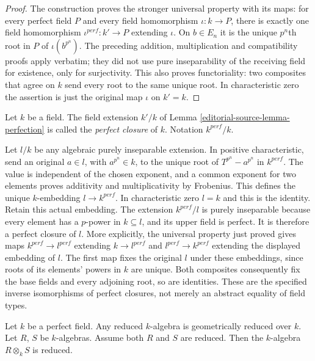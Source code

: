 \begin{proof}
The construction proves the stronger universal
property with its maps: for every perfect
field $P$ and every field homomorphism
$\iota:k\to P$, there is exactly one field
homomorphism $\iota^{perf}:k'\to P$ extending
$\iota$. On $b\in E_n$ it is the unique
$p^n$th root in $P$ of $\iota(b^{p^n})$.
The preceding addition, multiplication and
compatibility proofs apply verbatim; they
did not use pure inseparability of the
receiving field for existence, only for
surjectivity. This also proves functoriality:
two composites that agree on $k$ send every
root to the same unique root. In
characteristic zero the assertion is just
the original map $\iota$ on $k'=k$.
\end{proof}

\begin{definition}
\label{editorial-source-definition-perfection}
Let $k$ be a field. The field extension $k'/k$ of Lemma \ref{editorial-source-lemma-perfection}
is called the {\it perfect closure} of $k$. Notation $k^{perf}/k$.
\end{definition}

\noindent
Let $l/k$ be any algebraic purely inseparable
extension. In positive characteristic, send an
original $a\in l$, with $a^{p^n}\in k$, to
the unique root of $T^{p^n}-a^{p^n}$ in
$k^{perf}$. The value is independent of the
chosen exponent, and a common exponent for
two elements proves additivity and
multiplicativity by Frobenius. This defines
the unique $k$-embedding $l\to k^{perf}$.
In characteristic zero $l=k$ and this is
the identity. Retain this actual embedding.
The extension $k^{perf}/l$ is purely
inseparable because every element has a
$p$-power in $k\subseteq l$, and its upper
field is perfect. It is therefore a
perfect closure of $l$. More explicitly,
the universal property just proved gives
maps $k^{perf}\to l^{perf}$ extending
$k\to l^{perf}$ and $l^{perf}\to k^{perf}$
extending the displayed embedding of $l$.
The first map fixes the original $l$
under these embeddings, since roots of
its elements' powers in $k$ are unique.
Both composites consequently fix the
base fields and every adjoining root,
so are identities. These are the
specified inverse isomorphisms of
perfect closures, not merely an
abstract equality of field types.

\begin{lemma}
\label{editorial-source-lemma-perfect-reduced}
Let $k$ be a perfect field.
Any reduced $k$-algebra is geometrically reduced over $k$.
Let $R$, $S$ be $k$-algebras.
Assume both $R$ and $S$ are reduced.
Then the $k$-algebra $R \otimes_k S$ is reduced.
\end{lemma}

